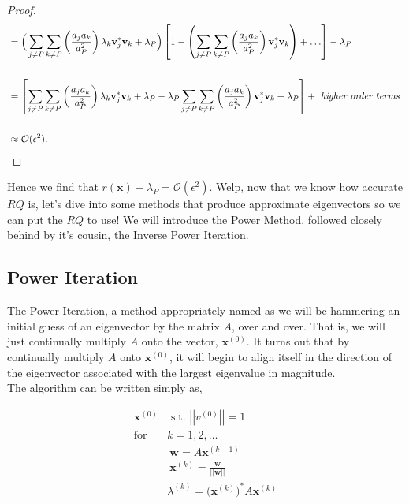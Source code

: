 \documentclass[paper=a4, fontsize=11pt]{scrartcl} %
\numberwithin{equation}{section} %
\numberwithin{figure}{section} %
\numberwithin{table}{section} %
\begin{document}
\begin{proof}
\begin{align*}
	&= \Big( \sum_{j\neq P} \sum_{k\neq P} \left( \frac{a_ja_k}{a_P^2} \right) \lambda_k \textbf{v}_j^{*}\textbf{v}_k + \lambda_P   \Big) \left[  1 - \left( \sum_{j\neq P} \sum_{k\neq P} \left( \frac{a_ja_k}{a_P^2} \right) \textbf{v}_j^{*}\textbf{v}_k   \right) +  \ldots  \right] - \lambda_P \\ \\
	&= \left[  \sum_{j\neq P} \sum_{k\neq P} \left( \frac{a_ja_k}{a_P^2} \right) \lambda_k \textbf{v}_j^{*}\textbf{v}_k + \lambda_P - \lambda_P \sum_{j\neq P} \sum_{k\neq P} \left( \frac{a_ja_k}{a_P^2} \right)  \textbf{v}_j^{*}\textbf{v}_k + \lambda_P    \right] + \mbox{ \emph{higher order terms} } \\ \\
	&\approx \mathcal{O}(\epsilon^2). \\
\end{align*}

\end{proof}

Hence we find that $r(\textbf{x}) - \lambda_P = \mathcal{O}(\epsilon^2).$ Welp, now that we know how accurate $RQ$ is, let's dive into some methods that produce approximate eigenvectors so we can put the $RQ$ to use! We will introduce the Power Method, followed closely behind by it's cousin, the Inverse Power Iteration. 



%
%
\subsection{Power Iteration}

The Power Iteration, a method appropriately named as we will be hammering an initial guess of an eigenvector by the matrix $A$, over and over. That is, we will just continually multiply $A$ onto the vector, $\textbf{x}^{(0)}$. It turns out that by continually multiply $A$ onto $\textbf{x}^{(0)}$,  it will begin to align itself in the direction of the eigenvector associated with the largest eigenvalue in magnitude. \\

The algorithm can be written simply as, 

\begin{align*}
\textbf{x}^{(0)} &\mbox{ s.t. } \left|\left|v^{(0)}\right|\right| = 1 \\ 
\mbox{for } &k=1,2,\ldots \\
\ \ \ \ &\ \textbf{w} = A\textbf{x}^{(k-1)} \\
\ \ \ \ &\ \textbf{x}^{(k)} = \frac{ \textbf{w} } { \left|\left| \textbf{w} \right|\right| } \\
\ \ \ \ &\lambda^{(k)} = \bigg( \textbf{x}^{(k)} \bigg)^{*} A \textbf{x}^{(k)} \\
\end{align*}
\end{document}
